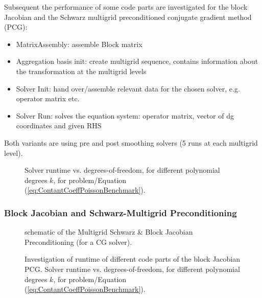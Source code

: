 \graphicspath{{./apdx-NodeSolverPerformance/PoissonConstCoeff/plots/}}

Subsequent the performance of some code parts are investigated for the block Jacobian and the Schwarz multigrid preconditioned conjugate gradient method (PCG):
\begin{itemize}
	\item MatrixAssembly: assemble Block matrix
	\item Aggregation basis init: create multigrid sequence, contains information about the transformation at the multigrid levels
	\item Solver Init: hand over/assemble relevant data for the chosen solver, e.g. operator matrix etc.
	\item Solver Run: solves the equation system: operator matrix, vector of dg coordinates and given RHS 
\end{itemize}
Both variants are using pre and post smoothing solvers (5 runs at each multigrid level).



\begin{figure}[!h]
	\begin{center}
		
	\end{center}
	\caption{
		Solver runtime vs. degrees-of-freedom, for different polynomial degrees $k$,
		for problem/Equation (\ref{eq:ContantCoeffPoissonBenchmark}).
	}
	\label{fig:ConstantCoeffRuntimes}
\end{figure}

\newpage

\subsubsection{Block Jacobian and Schwarz-Multigrid Preconditioning}

\begin{figure}[!h]
	\begin{center}
		
	\end{center}
	\caption{
		schematic of the Multigrid Schwarz \& Block Jacobian Preconditioning (for a CG solver).
	}
	\label{fig:schema_BlockPCG}
\end{figure}

\begin{figure}[!h]
	\begin{center}
		
	\end{center}
	\caption{
		Investigation of runtime of different code parts of the block Jacobian PCG. Solver runtime vs. degrees-of-freedom, for different polynomial degrees $k$,
		for problem/Equation (\ref{eq:ContantCoeffPoissonBenchmark}).
	}
	\label{fig:SIP_blockJacobianPCG}
\end{figure}
\newpage

